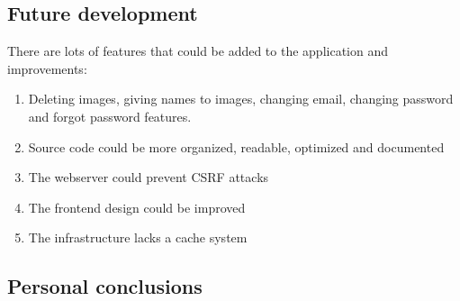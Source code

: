 \documentclass[../documentation.tex]{subfiles}
\begin{document}
\subsection{Future development}

There are lots of features that could be added to the application and improvements:
\begin{enumerate}
    \item Deleting images, giving names to images, changing email,
        changing password and forgot password features.
    \item Source code could be more organized, readable, optimized and documented
    \item The webserver could prevent CSRF attacks
    \item The frontend design could be improved
    \item The infrastructure lacks a cache system
\end{enumerate}

\subsection{Personal conclusions}
\end{document}
